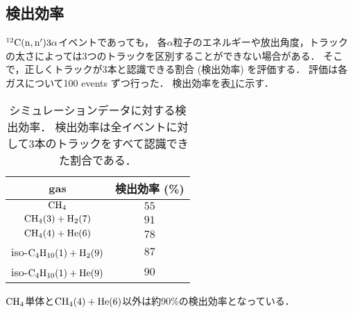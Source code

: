 \documentclass[../master]{subfiles}
\begin{document}
\subsection{検出効率}
${}^{12}{\rm C}({\rm n},{\rm n}')3\alpha$イベントであっても，
各$\alpha$粒子のエネルギーや放出角度，トラックの太さによっては3つのトラックを区別することができない場合がある．
そこで，正しくトラックが3本と認識できる割合 (検出効率) を評価する．
評価は各ガスについて100 events ずつ行った．
検出効率を表\ref{tab::detection_efficiency}に示す．
\begin{table}
  \centering
  \caption[シミュレーションデータに対する検出効率．]
          {シミュレーションデータに対する検出効率．
            検出効率は全イベントに対して3本のトラックをすべて認識できた割合である．}
  \label{tab::detection_efficiency}
  \begin{tabular}{cc}
    \toprule
    gas & 検出効率 (\%)\\
    \midrule
    $\rm CH_{4}$ & $55$ \\%
    $\rm CH_{4} (3) + H_{2} (7)$ & $91$ \\%
    $\rm CH_{4} (4) + He (6)$ & $78$ \\%
    iso-$\rm C_{4}H_{10} (1) + H_{2} (9)$ & $87$ \\%
    iso-$\rm C_{4}H_{10} (1) + He (9)$ & $90$ \\%
    \bottomrule
  \end{tabular}
\end{table}
$\rm CH_{4}$単体と$\rm CH_{4} (4) + He (6)$以外は約90\%の検出効率となっている．

\end{document}

